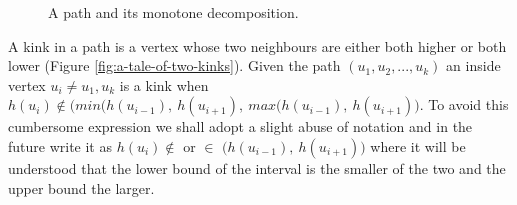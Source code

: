 \begin{figure}%
    \centering
    \qquad
    \caption{A path and its monotone decomposition.}
    \label{fig:monotone-decomposition}%
\end{figure}




A kink in a path is a vertex whose two neighbours are either both higher or both lower (Figure \ref{fig:a-tale-of-two-kinks}). Given the path $(u_1, u_2, ... , u_k)$ an inside vertex $u_i \ne u_1, u_k$ is a kink when $h(u_i) \notin \big( min(h(u_{i-1}),~h(u_{i+1}),~max(h(u_{i-1}),~h(u_{i+1}) \big)$. To avoid this cumbersome expression we shall adopt a slight abuse of notation and in the future write it as $h(u_i) \notin $ or $ \in $ $\big(h(u_{i-1}),~h(u_{i+1}) \big)$ where it will be understood that the lower bound of the interval is the smaller of the two and the upper bound the larger.

